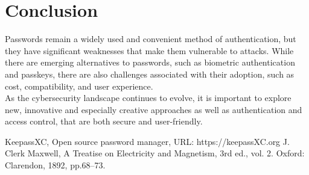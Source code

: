 \documentclass[conference]{IEEEtran}
\begin{document}
\section{Conclusion}
Passwords remain a widely used and convenient method of authentication, but they have significant weaknesses that make them vulnerable to attacks. While there are emerging alternatives to passwords, such as biometric authentication and passkeys, there are also challenges associated with their adoption, such as cost, compatibility, and user experience.\\
As the cybersecurity landscape continues to evolve, it is important to explore new, innovative and especially creative approaches as well as authentication and access control, that are both secure and user-friendly.



\begin{thebibliography}{00}
 KeepassXC, Open source password manager,  URL: https://keepassXC.org
 J. Clerk Maxwell, A Treatise on Electricity and Magnetism, 3rd ed., vol. 2. Oxford: Clarendon, 1892, pp.68--73.
\end{thebibliography}
\end{document}
